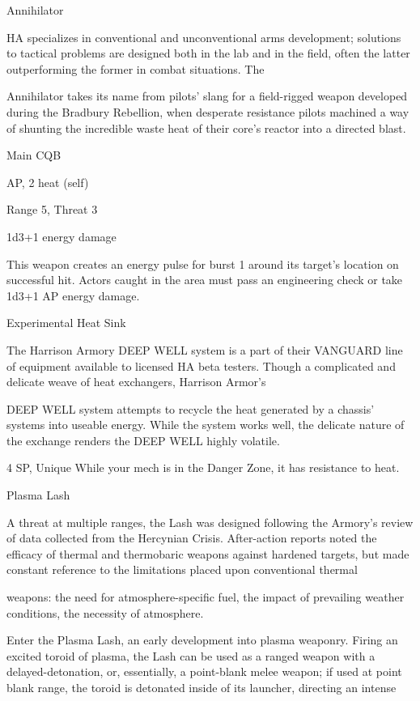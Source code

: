 Annihilator  

HA specializes in conventional and unconventional arms development; solutions to tactical problems are  
designed both in the lab and in the field, often the latter outperforming the former in combat situations. The  

Annihilator takes its name from pilots’ slang for a field-rigged weapon developed during the Bradbury  
Rebellion, when desperate resistance pilots machined a way of shunting the incredible waste heat of their  
core’s reactor into a directed blast.   

Main CQB
 
AP, 2 heat (self)
 
Range 5, Threat 3
 
1d3+1 energy damage
 
This weapon creates an energy pulse for burst 1 around its target’s location on successful hit.  
Actors caught in the area must pass an engineering check or take 1d3+1 AP energy damage.
 

Experimental Heat Sink  

The Harrison Armory DEEP WELL system is a part of their VANGUARD line of equipment available to  
licensed HA beta testers. Though a complicated and delicate weave of heat exchangers, Harrison Armor’s  

DEEP WELL system attempts to recycle the heat generated by a chassis’ systems into useable energy.  
While the system works well, the delicate nature of the exchange renders the DEEP WELL highly volatile.    

4 SP, Unique  
While your mech is in the Danger Zone, it has resistance to heat.
 

Plasma Lash  

A threat at multiple ranges, the Lash was designed following the Armory’s review of data collected from the  
Hercynian Crisis. After-action reports noted the efficacy of thermal and thermobaric weapons against  
hardened targets, but made constant reference to the limitations placed upon conventional thermal  

weapons: the need for atmosphere-specific fuel, the impact of prevailing weather conditions, the necessity  
of atmosphere.   

Enter the Plasma Lash, an early development into plasma weaponry. Firing an excited toroid of plasma, the  
Lash can be used as a ranged weapon with a delayed-detonation, or, essentially, a point-blank melee  
weapon; if used at point blank range, the toroid is detonated inside of its launcher, directing an intense  

